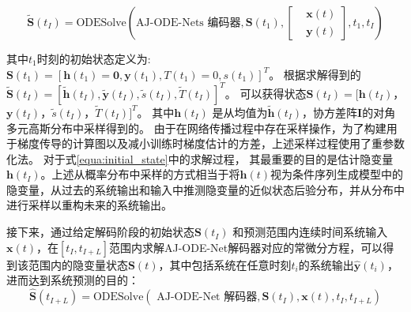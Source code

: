 \begin{equation}
\boldsymbol{\tilde S}(t_I)=\text{ODESolve}(\text{AJ-ODE-Nets 编码器},\boldsymbol S(t_1)
, 
\left [
\begin{aligned} 
&\boldsymbol {x}(t) \\
&\boldsymbol {y}(t)
\end{aligned}
\right ]
, t_1, t_I)
\label{equa:initial_state}
\end{equation}

其中$t_1$时刻的初始状态定义为:
$
\boldsymbol S(t_1)=\left[\boldsymbol h(t_1) = \boldsymbol 0,\boldsymbol y(t_1),T(t_1)=0,s(t_1)\right ]^T
$。 
根据求解得到的
$\boldsymbol{\tilde{S}}(t_I)=[\boldsymbol{\tilde h}(t_I), \boldsymbol{\tilde y}(t_I), \tilde s(t_I), \tilde T(t_I)]^T$。
可以获得状态$\boldsymbol{S}(t_I)=[\boldsymbol{h}(t_I)$，$ \boldsymbol{y}(t_I)$，$ \tilde s(t_I)$，$ \tilde T(t_I)]^T$。
其中$\boldsymbol{h}(t_I)$ 是从均值为$\boldsymbol{\tilde h}(t_I)$，协方差阵$\boldsymbol I$的对角多元高斯分布中采样得到的。
由于在网络传播过程中存在采样操作，为了构建用于梯度传导的计算图以及减小训练时梯度估计的方差，上述采样过程使用了重参数化法\cite{kingma2013auto}。
对于式\ref{equa:initial_state}中的求解过程，
其最重要的目的是估计隐变量$\boldsymbol h(t_I)$。上述从概率分布中采样的方式相当于将$\boldsymbol h(t)$视为条件序列生成模型中的隐变量，从过去的系统输出和输入中推测隐变量的近似状态后验分布，并从分布中进行采样以重构未来的系统输出\cite{10.5555/3454287.3454765,Hafner2019}。

接下来，通过给定解码阶段的初始状态$\boldsymbol S(t_I)$ 和预测范围内连续时间系统输入$\boldsymbol x(t)$，在$[t_I, t_{I+L}]$范围内求解AJ-ODE-Net解码器对应的常微分方程，可以得到该范围内的隐变量状态$\boldsymbol S(t)$，其中包括系统在任意时刻$t_i$的系统输出$\boldsymbol{\hat{y}}(t_i)$，进而达到系统预测的目的：
\begin{equation}
\boldsymbol {\hat S}(t_{I+L})=\text{ODESolve}(\text{ AJ-ODE-Net 解码器},\boldsymbol S(t_I)
, \boldsymbol {x}(t), t_I, t_{I+L})
\label{equ:decoding}
\end{equation}

